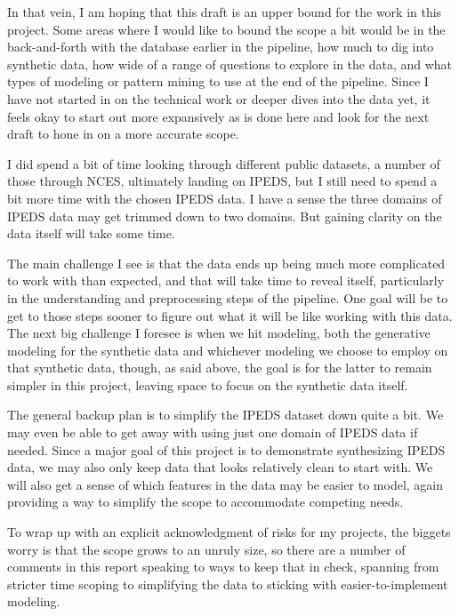\documentclass[sigconf, authorversion, nonacm]{acmart}
\begin{document}
    In that vein, I am hoping that this draft is an upper bound for the work in this project. Some areas where I would like to bound the scope a bit would be in the back-and-forth with the database earlier in the pipeline, how much to dig into synthetic data, how wide of a range of questions to explore in the data, and what types of modeling or pattern mining to use at the end of the pipeline. Since I have not started in on the technical work or deeper dives into the data yet, it feels okay to start out more expansively as is done here and look for the next draft to hone in on a more accurate scope.

    I did spend a bit of time looking through different public datasets, a number of those through NCES, ultimately landing on IPEDS, but I still need to spend a bit more time with the chosen IPEDS data. I have a sense the three domains of IPEDS data may get trimmed down to two domains. But gaining clarity on the data itself will take some time.

    The main challenge I see is that the data ends up being much more complicated to work with than expected, and that will take time to reveal itself, particularly in the understanding and preprocessing steps of the pipeline. One goal will be to get to those steps sooner to figure out what it will be like working with this data. The next big challenge I foresee is when we hit modeling, both the generative modeling for the synthetic data and whichever modeling we choose to employ on that synthetic data, though, as said above, the goal is for the latter to remain simpler in this project, leaving space to focus on the synthetic data itself.

    The general backup plan is to simplify the IPEDS dataset down quite a bit. We may even be able to get away with using just one domain of IPEDS data if needed. Since a major goal of this project is to demonstrate synthesizing IPEDS data, we may also only keep data that looks relatively clean to start with. We will also get a sense of which features in the data may be easier to model, again providing a way to simplify the scope to accommodate competing needs.

    To wrap up with an explicit acknowledgment of risks for my projects, the biggets worry is that the scope grows to an unruly size, so there are a number of comments in this report speaking to ways to keep that in check, spanning from stricter time scoping to simplifying the data to sticking with easier-to-implement modeling.
\end{document}
